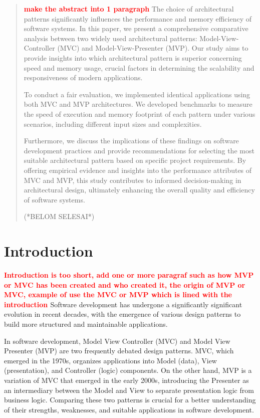 \documentclass[conference]{IEEEtran}
\begin{document}
\begin{abstract}
\textbf{\textcolor{red}{make the abstract into 1 paragraph}}
The choice of architectural patterns significantly influences the performance and memory efficiency of software systems. In this paper, we present a comprehensive comparative analysis between two widely used architectural patterns: Model-View-Controller (MVC) and Model-View-Presenter (MVP). Our study aims to provide insights into which architectural pattern is superior concerning speed and memory usage, crucial factors in determining the scalability and responsiveness of modern applications.

To conduct a fair evaluation, we implemented identical applications using both MVC and MVP architectures. We developed benchmarks to measure the speed of execution and memory footprint of each pattern under various scenarios, including different input sizes and complexities. 

Furthermore, we discuss the implications of these findings on software development practices and provide recommendations for selecting the most suitable architectural pattern based on specific project requirements. By offering empirical evidence and insights into the performance attributes of MVC and MVP, this study contributes to informed decision-making in architectural design, ultimately enhancing the overall quality and efficiency of software systems. 

(*BELOM SELESAI*)
\end{abstract}

\section{Introduction}

\textbf{\textcolor{red}{Introduction is too short, add one or more paragraf such as how MVP or MVC has been created and who created it, the origin of MVP or MVC, example of use the MVC or MVP which is lined with the introduction	}}
Software development has undergone a significantly significant evolution in recent decades, with the emergence of various design patterns to build more structured and maintainable applications. 

In software development, Model View Controller (MVC) and Model View Presenter (MVP) are two frequently debated design patterns. MVC, which emerged in the 1970s, organizes applications into Model (data), View (presentation), and Controller (logic) components. On the other hand, MVP is a variation of MVC that emerged in the early 2000s, introducing the Presenter as an intermediary between the Model and View to separate presentation logic from business logic. Comparing these two patterns is crucial for a better understanding of their strengths, weaknesses, and suitable applications in software development.
\end{document}
